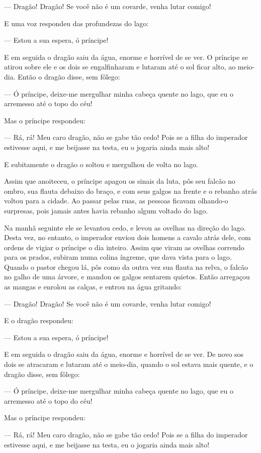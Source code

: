 — Dragão! Dragão! Se você não é um covarde, venha lutar comigo!

E uma voz respondeu das profundezas do lago:

— Estou a sua espera, ó príncipe! 

E em seguida o dragão saiu da água, enorme e horrível de se ver. O
príncipe se atirou sobre ele e os dois se engalfinharam e lutaram até
o sol ficar alto, ao meio-dia. Então o dragão disse, sem fôlego:

— Ó príncipe, deixe-me mergulhar minha cabeça quente no lago, que eu o
arremesso até o topo do céu!

Mas o príncipe respondeu:

— Rá, rá! Meu caro dragão, não se gabe tão cedo! Pois se a filha do
imperador estivesse aqui, e me beijasse na testa, eu o jogaria ainda
mais alto! 

E subitamente o dragão o soltou e mergulhou de volta no lago.

Assim que anoiteceu, o príncipe apagou os sinais da luta, pôs seu
falcão no ombro, sua flauta debaixo do braço, e com seus galgos na
frente e o rebanho atrás voltou para a cidade. Ao passar pelas ruas,
as pessoas ficavam olhando-o surpresas, pois jamais antes havia
rebanho algum voltado do lago.

Na manhã seguinte ele se levantou cedo, e levou as ovelhas na direção
do lago. Desta vez, no entanto, o imperador enviou dois homens a
cavalo atrás dele, com ordens de vigiar o príncipe o dia inteiro.
Assim que viram as ovelhas correndo para os prados, subiram numa
colina íngreme, que dava vista para o lago. Quando o pastor chegou
lá, pôs como da outra vez sua flauta na relva, o falcão no galho de
uma árvore, e mandou os galgos sentarem quietos. Então arregaçou as
mangas e enrolou as calças, e entrou na água gritando:

— Dragão! Dragão! Se você não é um covarde, venha lutar comigo!

E o dragão respondeu: 

— Estou a sua espera, ó príncipe! 

E em seguida o dragão saiu da água, enorme e horrível de se ver. De
novo sos dois se atracaram e lutaram até o meio-dia, quando o sol
estava mais quente, e o dragão disse, sem fôlego:

— Ó príncipe, deixe-me mergulhar minha cabeça quente no lago, que eu o
arremesso até o topo do céu!

Mas o príncipe respondeu:

— Rá, rá! Meu caro dragão, não se gabe tão cedo! Pois se a filha do
imperador estivesse aqui, e me beijasse na testa, eu o jogaria ainda
mais alto! 

